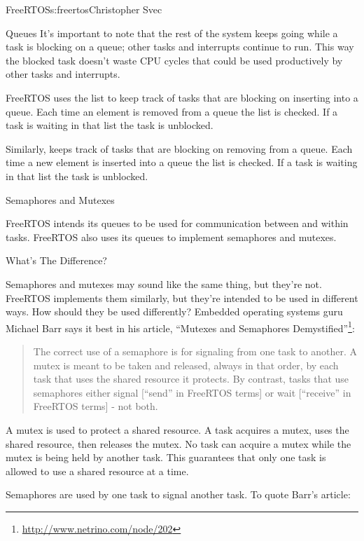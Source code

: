 \begin{aosachapter}{FreeRTOS}{s:freertos}{Christopher Svec}
\begin{aosasect1}{Queues}
It's important to note that the rest of the system keeps going while a
task is blocking on a queue; other tasks and interrupts continue to
run. This way the blocked task doesn't waste CPU cycles that could be
used productively by other tasks and interrupts.

FreeRTOS uses the  list to keep track of
tasks that are blocking on inserting into a queue. Each time an
element is removed from a queue the  list is
checked. If a task is waiting in that list the task is unblocked.

Similarly,  keeps track of tasks that are
blocking on removing from a queue.  Each time a new element is
inserted into a queue the  list is
checked. If a task is waiting in that list the task is unblocked.

\begin{aosasect2}{Semaphores and Mutexes}

FreeRTOS intends its queues to be used for communication between and
within tasks.  FreeRTOS also uses its queues to implement semaphores
and mutexes.

\begin{aosasect3}{What's The Difference?}

Semaphores and mutexes may sound like the same thing, but they're
not. FreeRTOS implements them similarly, but they're intended to be
used in different ways.  How should they be used differently? Embedded
operating systems guru Michael Barr says it best in his article, ``Mutexes and
Semaphores
Demystified''\footnote{\url{http://www.netrino.com/node/202}}:

\begin{quotation}
\noindent The correct use of a semaphore is for signaling from one task to another. A mutex 
is meant to be taken and released, always in that order, by each task that uses the 
shared resource it protects. By contrast, tasks that use semaphores either signal 
[``send'' in FreeRTOS terms] or wait [``receive'' in FreeRTOS terms] - not both.
\end{quotation}

A mutex is used to protect a shared resource. A task acquires a mutex,
uses the shared resource, then releases the mutex. No task can acquire
a mutex while the mutex is being held by another task. This guarantees
that only one task is allowed to use a shared resource at a time.

Semaphores are used by one task to signal another task. To quote
Barr's article:


\end{aosasect3}
\end{aosasect2}
\end{aosasect1}
\end{aosachapter}
